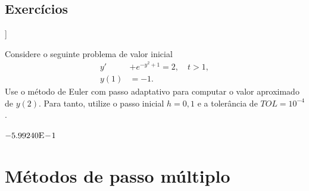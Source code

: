 \begin{ex}




 
      
  



\end{ex}

\subsection{Exercícios}

\begin{flushleft}
  [[tag:revisar]]
\end{flushleft}

\begin{exer}
  Considere o seguinte problema de valor inicial
  \begin{align}
    y' &+ e^{-y^2+1} = 2,\quad t>1,\\
    y(1) &= -1.
  \end{align}
Use o método de Euler com passo adaptativo para computar o valor aproximado de $y(2)$. Para tanto, utilize o passo inicial $h=0,1$ e a tolerância de $TOL=10^{-4}$.
\end{exer}
\begin{resp}
  $-5.99240\mathrm{E}\!-\!1$
\end{resp}


\section{Métodos de passo múltiplo}\label{cap_pvi_sec_passo_mult}

